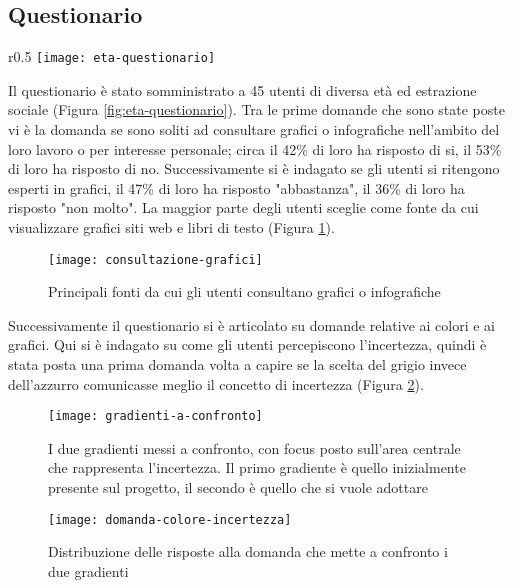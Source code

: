 \subsection{Questionario}
\begin{wrapfigure}{r}{0.5\textwidth}
    \centering
    \texttt{[image: eta-questionario]}
    \caption{Età degli utenti che hanno risposto al questionario}
    \label{fig:eta-questionario}
\end{wrapfigure}

Il questionario è stato somministrato a 45 utenti di diversa età ed estrazione sociale (Figura \ref{fig:eta-questionario}). Tra le prime domande che sono state poste vi è la domanda se sono soliti ad consultare grafici o infografiche nell'ambito del loro lavoro o per interesse personale; circa il 42\% di loro ha risposto di si, il 53\% di loro ha risposto di no. Successivamente si è indagato se gli utenti si ritengono esperti in grafici, il 47\% di loro ha risposto "abbastanza", il 36\% di loro ha risposto "non molto". La maggior parte degli utenti sceglie come fonte da cui visualizzare grafici siti web e libri di testo (Figura \ref{fig:consultazione-grafici}).\\

\begin{figure}[!ht] 
    \centering 
    \texttt{[image: consultazione-grafici]} 
    \caption{Principali fonti da cui gli utenti consultano grafici o infografiche}
    \label{fig:consultazione-grafici}
\end{figure}

Successivamente il questionario si è articolato su domande relative ai colori e ai grafici. Qui si è indagato su come gli utenti percepiscono l'incertezza, quindi è stata posta una prima domanda volta a capire se la scelta del grigio invece dell'azzurro comunicasse meglio il concetto di incertezza (Figura \ref{fig:gradienti-a-confronto}). 

\begin{figure}[!ht] 
    \centering 
    \texttt{[image: gradienti-a-confronto]} 
    \caption{I due gradienti messi a confronto, con focus posto sull'area centrale che rappresenta l'incertezza. Il primo gradiente è quello inizialmente presente sul progetto, il secondo è quello che si vuole adottare}
    \label{fig:gradienti-a-confronto}
\end{figure}


\begin{figure}[!ht] 
    \centering 
    \texttt{[image: domanda-colore-incertezza]}
    \caption{Distribuzione delle risposte alla domanda che mette a confronto i due gradienti}
    \label{fig:domanda-colore-incertezza}
\end{figure}

